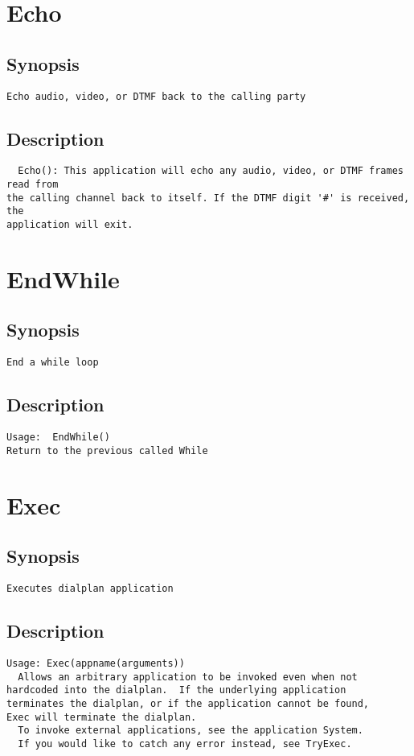 \section{Echo}
\subsection{Synopsis}
\begin{verbatim}
Echo audio, video, or DTMF back to the calling party
\end{verbatim}
\subsection{Description}
\begin{verbatim}
  Echo(): This application will echo any audio, video, or DTMF frames read from
the calling channel back to itself. If the DTMF digit '#' is received, the
application will exit.

\end{verbatim}


\section{EndWhile}
\subsection{Synopsis}
\begin{verbatim}
End a while loop
\end{verbatim}
\subsection{Description}
\begin{verbatim}
Usage:  EndWhile()
Return to the previous called While

\end{verbatim}


\section{Exec}
\subsection{Synopsis}
\begin{verbatim}
Executes dialplan application
\end{verbatim}
\subsection{Description}
\begin{verbatim}
Usage: Exec(appname(arguments))
  Allows an arbitrary application to be invoked even when not
hardcoded into the dialplan.  If the underlying application
terminates the dialplan, or if the application cannot be found,
Exec will terminate the dialplan.
  To invoke external applications, see the application System.
  If you would like to catch any error instead, see TryExec.

\end{verbatim}



